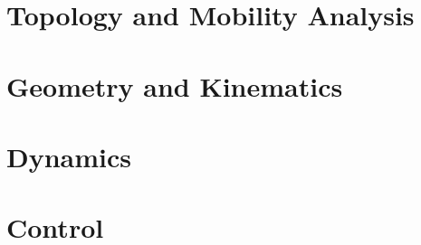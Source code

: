 \documentclass{scrreprt}
\subtitle{Coursework}
\begin{document}
\maketitle

\tableofcontents 

\cleardoublepage

\pagestyle{plain}


\chapter{Topology and Mobility Analysis}
%
%
%
\chapter{Geometry and Kinematics}
%
%
% 
\chapter{Dynamics}
%
%
% 
\chapter{Control}
%



%

\end{document}
